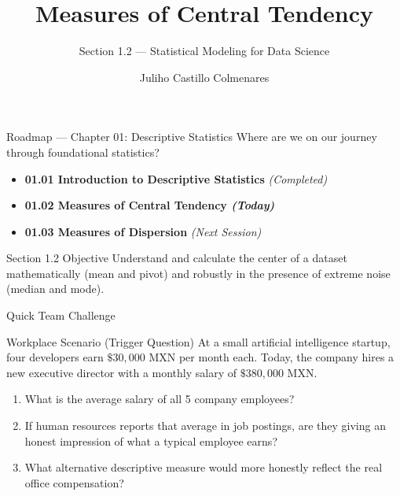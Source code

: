\documentclass[aspectratio=169,xcolor={dvipsnames,table}]{beamer}
\title{Measures of Central Tendency}
\subtitle{Section 1.2 — Statistical Modeling for Data Science}
\author[J. Castillo Colmenares]{Juliho Castillo Colmenares}
\institute{Tecnológico de Monterrey}
\date{}
\begin{document}
\begin{frame}[plain]
  \titlepage
\end{frame}

\begin{frame}{Roadmap — Chapter 01: Descriptive Statistics}
  Where are we on our journey through foundational statistics? \pause
  \begin{itemize}
    \item \textbf{01.01 Introduction to Descriptive Statistics} \emph{(Completed)} \pause
    \item \color{TecRojo}\textbf{01.02 Measures of Central Tendency \emph{(Today)}}\color{black} \pause
    \item \textbf{01.03 Measures of Dispersion} \emph{(Next Session)}
  \end{itemize}
  \vspace{1em}
  \begin{block}{Section 1.2 Objective}
    Understand and calculate the center of a dataset mathematically (mean and pivot) and robustly in the presence of extreme noise (median and mode).
  \end{block}
\end{frame}

\begin{frame}{Quick Team Challenge}
  \begin{alertblock}{Workplace Scenario (Trigger Question)}
    At a small artificial intelligence startup, four developers earn $\$30,000$ MXN per month each. Today, the company hires a new executive director with a monthly salary of $\$380,000$ MXN.
    \vspace{0.6em}
    \begin{enumerate}
      \item What is the average salary of all 5 company employees? \pause
      \item If human resources reports that average in job postings, are they giving an honest impression of what a typical employee earns? \pause
      \item What alternative descriptive measure would more honestly reflect the real office compensation?
    \end{enumerate}
  \end{alertblock}
\end{frame}
\end{document}
